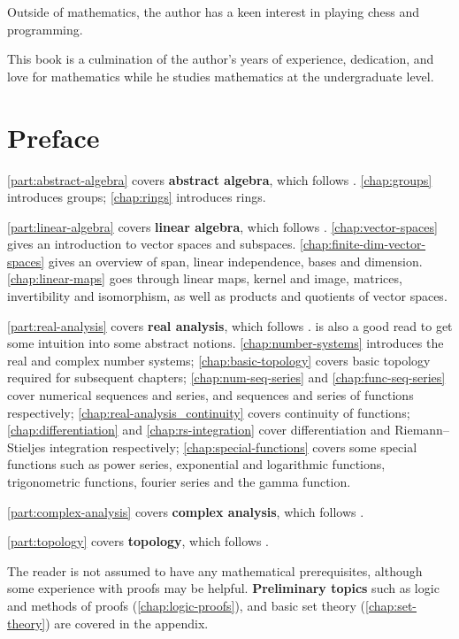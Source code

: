 Outside of mathematics, the author has a keen interest in playing chess and programming.

This book is a culmination of the author's years of experience, dedication, and love for mathematics while he studies mathematics at the undergraduate level.
\pagebreak

\section*{Preface}
\ifabsalg
\cref{part:abstract-algebra} covers \textbf{abstract algebra}, which follows \cite{dummit-foote,artin}. \cref{chap:groups} introduces groups; \cref{chap:rings} introduces rings.
\fi

\iflinalg
\cref{part:linear-algebra} covers \textbf{linear algebra}, which follows \cite{axler}. \cref{chap:vector-spaces} gives an introduction to vector spaces and subspaces. \cref{chap:finite-dim-vector-spaces} gives an overview of span, linear independence, bases and dimension. \cref{chap:linear-maps} goes through linear maps, kernel and image, matrices, invertibility and isomorphism, as well as products and quotients of vector spaces.
\fi

\ifranalysis
\cref{part:real-analysis} covers \textbf{real analysis}, which follows \cite{rudin,apostol,bartle-sherbert}. \cite{alcock} is also a good read to get some intuition into some abstract notions. \cref{chap:number-systems} introduces the real and complex number systems; \cref{chap:basic-topology} covers basic topology required for subsequent chapters; \cref{chap:num-seq-series} and \cref{chap:func-seq-series} cover numerical sequences and series, and sequences and series of functions respectively; \cref{chap:real-analysis_continuity} covers continuity of functions; \cref{chap:differentiation} and \cref{chap:rs-integration} cover differentiation and Riemann--Stieljes integration respectively; \cref{chap:special-functions} covers some special functions such as power series, exponential and logarithmic functions, trigonometric functions, fourier series and the gamma function.
\fi

\ifcanalysis
\cref{part:complex-analysis} covers \textbf{complex analysis}, which follows \cite{ahlfors,lang}.
\fi

\iftop
\cref{part:topology} covers \textbf{topology}, which follows \cite{munkres}.
\fi

The reader is not assumed to have any mathematical prerequisites, although some experience with proofs may be helpful. \textbf{Preliminary topics} such as logic and methods of proofs (\cref{chap:logic-proofs}), and basic set theory (\cref{chap:set-theory}) are covered in the appendix.
\pagebreak

